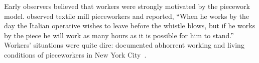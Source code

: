\documentclass[trackingWork]{subfiles}
\begin{document}



\subsubsection{\pieceworkpers}
Early observers believed that workers were strongly motivated by the piecework model.
\citeauthor{clark1908cotton} observed textile mill pieceworkers and reported,
``When he works by the day the Italian operative wishes to leave before the whistle blows,
but if he works by the piece he will work as many hours as it is possible for him to stand.''
Workers' situations were quite dire: \citeauthor{riisOtherSideLives}  documented abhorrent working and living conditions of pieceworkers in New York City~\cite{riisOtherSideLives}.

\end{document}
